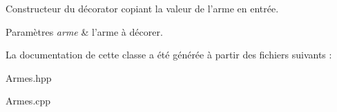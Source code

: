 Constructeur du décorator copiant la valeur de l'arme en entrée. 


\begin{DoxyParams}{Paramètres}
{\em arme} & l'arme à décorer. \\
\hline
\end{DoxyParams}


La documentation de cette classe a été générée à partir des fichiers suivants \-:\begin{DoxyCompactItemize}
\item 
Armes.\-hpp\item 
Armes.\-cpp\end{DoxyCompactItemize}
